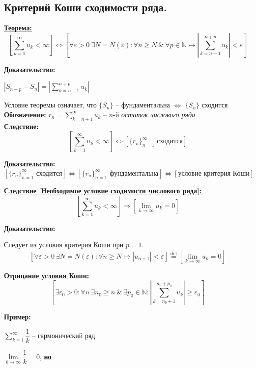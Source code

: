 \documentclass[a4paper,12pt]{article} %
\newcommand{\eqdef}{\stackrel{\mathrm{def}}{=}}
\newcommand{\N}{\mathbb{N}}
\newcommand{\useriesl}{\sum\limits_{k=1}^{\infty} u_k < \infty}
\begin{document}
\subsection{Критерий Коши сходимости ряда.}

\underline{\textbf{Теорема:}}
\[ \left[\useriesl \right] \Leftrightarrow \left[\forall \varepsilon > 0 \ \exists N = N(\varepsilon): \forall n \geqslant N \ \& \ \forall p \in \N \mapsto \left|\sum\limits_{k=n+1}^{n+p} u_k \right| < \varepsilon \right] \]

\textbf{Доказательство:}

$|S_{n+p} - S_n| = \left|\sum\limits_{k=n+1}^{n+p} u_k \right|$

Условие теоремы означает, что $\{ S_n \}$ -- фундаментальна $\Leftrightarrow$ $\{ S_n \}$ сходится\\

\textbf{Обозначение:}
$r_n = \sum\limits_{k=n+1}^{\infty} u_k$ -- $n$-й \textit{остаток числового ряда}\\

\textbf{Следствие:}
\[ \left[ \useriesl \right] \Leftrightarrow \left[ \{ r_n \}_{n=1}^{\infty} \text{ сходится} \right] \]

\textbf{Доказательство:}
\[ \left[ \{ r_n \}_{n=1}^{\infty} \text{ сходится} \right] \Leftrightarrow \left[ \{ r_n \}_{n=1}^{\infty} \text{ фундаментальна} \right] \Leftrightarrow \left[ \text{условие критерия Коши} \right] \]

\underline{\textbf{Следствие [Необходимое условие сходимости числового ряда]:}}
\[ \left[ \useriesl \right] \Rightarrow \left[ \lim\limits_{k \to \infty} u_k = 0 \right] \]

\textbf{Доказательство:}

Следует из условия критерия Коши при $p = 1$.
\[ \left[ \forall \varepsilon > 0 \ \exists N = N(\varepsilon): \forall n \geqslant N \mapsto |u_{n+1}|<\varepsilon \right] \eqdef \left[ \lim\limits_{k \to \infty}  u_k = 0 \right] \]

\underline{\textbf{Отрицание условия Коши:}}
\[ \left[ \exists \varepsilon_0 > 0: \forall n \ \exists n_0 \geqslant n \ \& \ \exists p_0 \in \N: \left| \sum\limits_{k = n_0 + 1}^{n_0 + p_0} u_k \right| \geqslant \varepsilon_0 \right] \]

\textbf{Пример:}

$\sum\limits_{k=1}^{\infty} \dfrac{1}{k}$ -- гармонический ряд

$\lim\limits_{k \to \infty} \dfrac{1}{k} = 0$, \underline{\textbf{но}}
\end{document}
